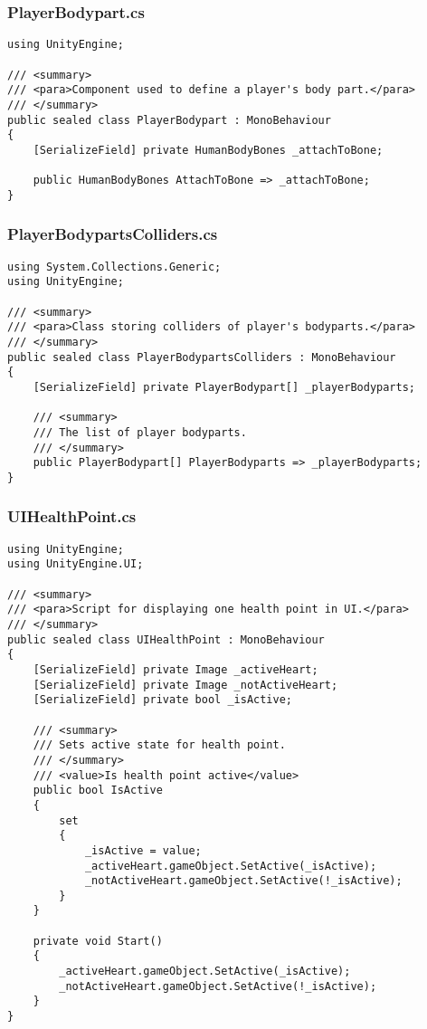\subsubsection*{PlayerBodypart.cs}
\begin{verbatim}
using UnityEngine;

/// <summary>
/// <para>Component used to define a player's body part.</para>
/// </summary>
public sealed class PlayerBodypart : MonoBehaviour
{
    [SerializeField] private HumanBodyBones _attachToBone;

    public HumanBodyBones AttachToBone => _attachToBone;
}
\end{verbatim}
\subsubsection*{PlayerBodypartsColliders.cs}
\begin{verbatim}
using System.Collections.Generic;
using UnityEngine;

/// <summary>
/// <para>Class storing colliders of player's bodyparts.</para>
/// </summary>
public sealed class PlayerBodypartsColliders : MonoBehaviour
{
    [SerializeField] private PlayerBodypart[] _playerBodyparts;

    /// <summary>
    /// The list of player bodyparts.
    /// </summary>
    public PlayerBodypart[] PlayerBodyparts => _playerBodyparts;
}
\end{verbatim}
\subsubsection*{UIHealthPoint.cs}
\begin{verbatim}
using UnityEngine;
using UnityEngine.UI;

/// <summary>
/// <para>Script for displaying one health point in UI.</para>
/// </summary>
public sealed class UIHealthPoint : MonoBehaviour
{
    [SerializeField] private Image _activeHeart;
    [SerializeField] private Image _notActiveHeart;
    [SerializeField] private bool _isActive;

    /// <summary>
    /// Sets active state for health point.
    /// </summary>
    /// <value>Is health point active</value>
    public bool IsActive
    {
        set
        {
            _isActive = value;
            _activeHeart.gameObject.SetActive(_isActive);
            _notActiveHeart.gameObject.SetActive(!_isActive);
        }
    }

    private void Start()
    {
        _activeHeart.gameObject.SetActive(_isActive);
        _notActiveHeart.gameObject.SetActive(!_isActive);
    }
}
\end{verbatim}
